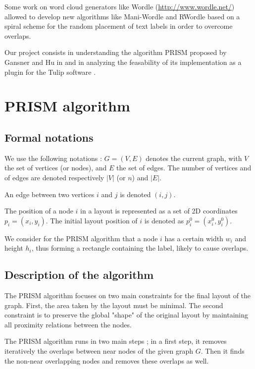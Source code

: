 \documentclass[12pt]{report}
\begin{document}
Some work on word cloud generators like Wordle (\url{http://www.wordle.net/}) allowed to develop new algorithms like Mani-Wordle \cite{Koh10} and RWordle \cite{SSSK12} based on a spiral scheme for the random placement of text labels in order to overcome overlaps.


\bigskip
Our project consists in understanding the algorithm PRISM proposed by Gansner and Hu in \cite{Gansner08} and in analyzing the feasability of its implementation as a plugin for the Tulip software \cite{Auber12}.



\chapter{PRISM algorithm}

\section{Formal notations}

We use the following notations : $G = (V,E)$ denotes the current graph, with $V$ the set of vertices (or nodes), and $E$ the set of edges. The number of vertices and of edges are denoted respectively $|V|$ (or $n$) and $|E|$.

An edge between two vertices $i$ and $j$ is denoted $(i,j)$.

The position of a node $i$ in a layout is represented as a set of 2D coordinates $p_i = (x_i, y_i)$. The initial layout position of $i$ is denoted as $p_i^0 = (x_i^0, y_i^0)$.

We consider for the PRISM algorithm that a node $i$ has a certain width $w_i$ and height $h_i$, thus forming a rectangle containing the label, likely to cause overlaps.

\section{Description of the algorithm}

The PRISM algorithm focuses on two main constraints for the final layout of the graph. First, the area taken by the layout must be minimal. The second constraint is to preserve the global "shape" of the original layout by maintaining all proximity relations between the nodes.

The PRISM algorithm runs in two main steps ; in a first step, it removes iteratively the overlaps between near nodes of the given graph $G$. Then it finds the non-near overlapping nodes and removes these overlaps as well.
\end{document}
